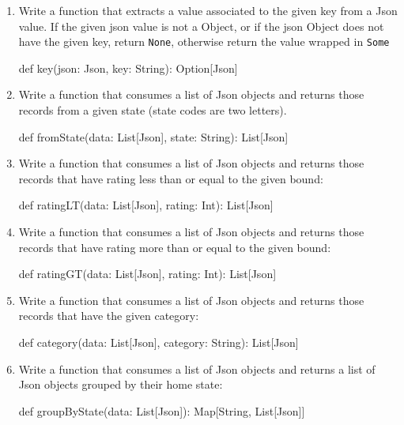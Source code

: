 \begin{enumerate}
    \item Write a function that extracts a value associated to the given key
    from a Json value. If the given json value is not a Object, or if the json
    Object does not have the given key, return \verb|None|, otherwise return
    the value wrapped in \verb|Some|
    \begin{scalacode}
    def key(json: Json, key: String): Option[Json]
    \end{scalacode}

    \item Write a function that consumes a list of Json objects and returns
    those records from a given state (state codes are two letters).
    \begin{scalacode}
    def fromState(data: List[Json], state: String): List[Json]
    \end{scalacode}

    \item Write a function that consumes a list of Json objects and returns
    those records that have rating less than or equal to the given bound:
    \begin{scalacode}
    def ratingLT(data: List[Json], rating: Int): List[Json]
    \end{scalacode}

    \item Write a function that consumes a list of Json objects and returns
    those records that have rating more than or equal to the given bound:
    \begin{scalacode}
    def ratingGT(data: List[Json], rating: Int): List[Json]
    \end{scalacode}

    \item Write a function that consumes a list of Json objects and returns
    those records that have the given category:
    \begin{scalacode}
    def category(data: List[Json], category: String): List[Json]
    \end{scalacode}

    \item Write a function that consumes a list of Json objects and returns
    a list of Json objects grouped by their home state:
    \begin{scalacode}
    def groupByState(data: List[Json]): Map[String, List[Json]]
    \end{scalacode}


\end{enumerate}
